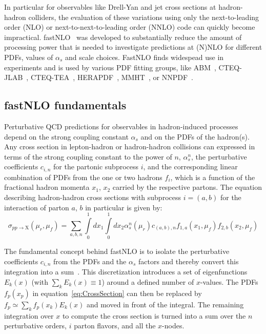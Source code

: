 \documentclass{PoS}
\begin{document}
In particular for observables like Drell-Yan and jet cross sections at
hadron-hadron colliders, the evaluation of these variations using only
the next-to-leading order (NLO) or next-to-next-to-leading order (NNLO)
code can quickly become impractical.
fastNLO~\cite{Britzger:2012bs,Wobisch:2011ij,Kluge:2006xs} was developed
to substantially reduce the amount of processing power that is needed to
investigate predictions at (N)NLO for different PDFs, values of
$\alpha_s$ and scale choices.
  FastNLO finds widespead use in experiments and is used by various PDF fitting groups,
  like ABM~\cite{Alekhin:2013nda}, CTEQ-JLAB~\cite{Owens:2012bv},
  CTEQ-TEA~\cite{Dulat:2015mca}, HERAPDF~\cite{Abramowicz:2015mha},
  MMHT~\cite{Harland-Lang:2014zoa}, or NNPDF~\cite{Ball:2014uwa}.

\subsection{fastNLO fundamentals}

Perturbative QCD predictions for observables in hadron-induced
processes depend on the strong coupling constant $\alpha_s$ and on the
PDFs of the hadron(s). Any cross section in lepton-hadron or
hadron-hadron collisions can expressed in terms of the
strong coupling constant to the power of $n$, $\alpha_s^n$, the
perturbative coefficients $c_{i,n}$ for the partonic subprocess $i$,
and the corresponding linear combination of PDFs from the one or two
hadrons $f_i$, which is a function of the fractional hadron momenta
$x_1$, $x_2$ carried by the respective partons.
The equation describing hadron-hadron cross sections with subprocess $i=(a,b)$
for the interaction of parton $a$, $b$ in particular is given by:
\begin{equation}\label{eq:CrossSection}
  \sigma_{pp\rightarrow\mathrm{X}}(\mu_r,\mu_f) =
  \sum\limits_{a,b,n}\int\limits_0^1dx_1\int\limits_0^1dx_2
    \alpha_s^n(\mu_r) c_{(a,b),n} f_{1,a}(x_1,\mu_f) f_{2,b}(x_2,\mu_f)
\end{equation}

The fundamental concept behind fastNLO is to isolate the perturbative
coefficients $c_{i,n}$ from the PDFs and the $\alpha_s$ factors and thereby
convert this integration into a sum~\cite{Pascaud:1994vx,Wobisch:00}.
This discretization introduces a set of eigenfunctions $E_k(x)$
(with $\sum_k E_k(x) \equiv 1$) around a defined number of $x$-values.
The PDFs $f_p(x_p)$ in equation~\ref{eq:CrossSection} can then be replaced
by $f_p \simeq \sum_k f_p(x_k) E_k(x)$ and moved in front of the integral.
The remaining integration over $x$ to compute the cross section is
turned into a sum over the $n$ perturbative orders, $i$ parton flavors,
and all the $x$-nodes.
\end{document}
